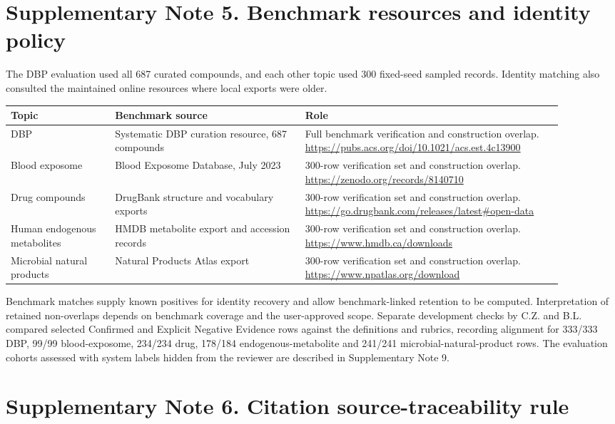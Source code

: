 \documentclass[10pt]{article}
\begin{document}
\section*{Supplementary Note 5. Benchmark resources and identity policy}

The DBP evaluation used all 687 curated compounds, and each other topic used 300 fixed-seed sampled records. Identity matching also consulted the maintained online resources where local exports were older.

\begin{longtable}{p{0.17\linewidth}p{0.31\linewidth}p{0.42\linewidth}}
\toprule
Topic & Benchmark source & Role \\
\midrule
DBP & Systematic DBP curation resource, 687 compounds & Full benchmark verification and construction overlap. \url{https://pubs.acs.org/doi/10.1021/acs.est.4c13900} \\
Blood exposome & Blood Exposome Database, July 2023 & 300-row verification set and construction overlap. \url{https://zenodo.org/records/8140710} \\
Drug compounds & DrugBank structure and vocabulary exports & 300-row verification set and construction overlap. \url{https://go.drugbank.com/releases/latest#open-data} \\
Human endogenous metabolites & HMDB metabolite export and accession records & 300-row verification set and construction overlap. \url{https://www.hmdb.ca/downloads} \\
Microbial natural products & Natural Products Atlas export & 300-row verification set and construction overlap. \url{https://www.npatlas.org/download} \\
\bottomrule
\end{longtable}

Benchmark matches supply known positives for identity recovery and allow benchmark-linked retention to be computed. Interpretation of retained non-overlaps depends on benchmark coverage and the user-approved scope. Separate development checks by C.Z. and B.L. compared selected Confirmed and Explicit Negative Evidence rows against the definitions and rubrics, recording alignment for 333/333 DBP, 99/99 blood-exposome, 234/234 drug, 178/184 endogenous-metabolite and 241/241 microbial-natural-product rows. The evaluation cohorts assessed with system labels hidden from the reviewer are described in Supplementary Note 9.

\section*{Supplementary Note 6. Citation source-traceability rule}
\end{document}

